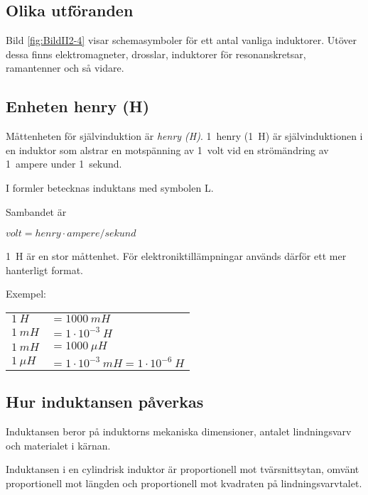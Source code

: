 
\subsection{Olika utföranden}

Bild \ref{fig:BildII2-4} visar schemasymboler för ett antal vanliga induktorer.
Utöver dessa finns elektromagneter, drosslar, induktorer för resonanskretsar,
ramantenner och så vidare.

\subsection{Enheten henry (H)}

Måttenheten för självinduktion är \emph{henry (H)}.
1~henry (1~H) är självinduktionen i en induktor som alstrar en motspänning av
1~volt vid en strömändring av 1~ampere under 1~sekund.

I formler betecknas induktans med symbolen L.

Sambandet är

\(volt = henry \cdot ampere/sekund\)

1~H är en stor måttenhet. För elektroniktillämpningar används därför ett mer
hanterligt format.

Exempel:

\begin{tabular}{ll}
\(1\ H \) & \(= 1000\ mH\) \\
\(1\ mH\) & \(= 1 \cdot 10^{-3}\ H\) \\
\(1\ mH\) & \(= 1000\ \mu H\) \\
\(1\ \mu H\) & \(= 1 \cdot 10^{-3}\ mH = 1 \cdot 10^{-6}\ H \)
\end{tabular}

\subsection{Hur induktansen påverkas}

Induktansen beror på induktorns mekaniska dimensioner, antalet lindningsvarv och
materialet i kärnan.

Induktansen i en cylindrisk induktor är proportionell mot tvärsnittsytan, omvänt
proportionell mot längden och proportionell mot kvadraten på lindningsvarvtalet.

